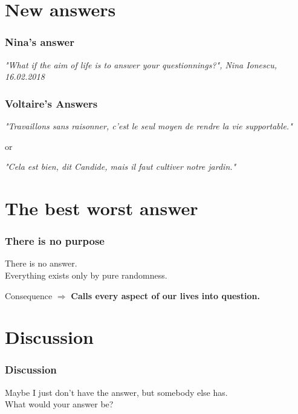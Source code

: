\documentclass{beamer}
\begin{document}
    \section{New answers} %
    \begin{frame}
    	\frametitle{Nina's answer}
    		
    	\textit{"What if the aim of life is to answer your questionnings?", Nina Ionescu, 16.02.2018}
    \end{frame}
    \begin{frame}
    	\frametitle{Voltaire's Answers}
    		
    	\textit{"Travaillons sans raisonner, c'est le seul moyen de rendre la vie supportable."} \pause
    	\begin{center}
    		or \pause
    	\end{center}
    	\textit{"Cela est bien, dit Candide, mais il faut cultiver notre jardin."}
    		
    \end{frame}
    
    \section{The best worst answer}
    
    \begin{frame}
    	\frametitle{There is no purpose}
    	There is no answer. \\ \pause
    	Everything exists only by pure randomness. \\ \pause
    	\begin{alertblock}{Consequence}
    		$\Rightarrow$ \textbf{Calls every aspect of our lives into question.}
		\end{alertblock}
    \end{frame}
    
    
    \section{Discussion}
    
    \begin{frame}
    	\frametitle{Discussion}
    	
    	Maybe I just don't have the answer, but somebody else has. \\
    	What would your answer be?
    \end{frame}
    
\end{document}
